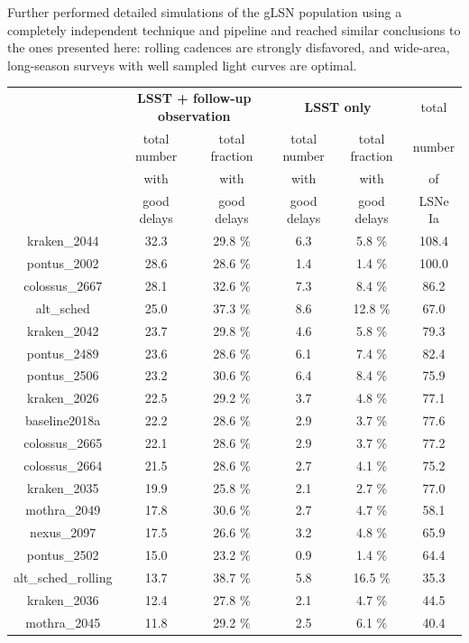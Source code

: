 Further \cite{Goldstein:2018bue} performed detailed simulations of the gLSN population using a completely independent technique and pipeline and reached similar conclusions to the ones presented here: rolling cadences are strongly disfavored, and wide-area, long-season surveys with well sampled light curves are optimal.


\begin{table}
\centering
\begin{tabular}{c|c|c|c|c|c}
\multicolumn{1}{c}{}& \multicolumn{2}{c}{\textbf{LSST + follow-up observation}}  & \multicolumn{2}{c}{\textbf{LSST only}} & \multicolumn{1}{c}{total } \\

& total number  & total fraction  & total number  & total fraction  & number \\
&  with & with & with& with & of\\
& good delays & good delays& good delays& good delays&LSNe Ia\\
\hline
kraken\_2044 & 32.3 & 29.8 \% & 6.3 & 5.8 \% & 108.4 \\
\hline
pontus\_2002 & 28.6 & 28.6 \% & 1.4 & 1.4 \% & 100.0\\
\hline
colossus\_2667 & 28.1 & 32.6 \% & 7.3 & 8.4 \% & 86.2 \\
\hline
alt\_sched & 25.0 & 37.3 \% & 8.6 & 12.8 \% & 67.0 \\
\hline
kraken\_2042 & 23.7 &  29.8 \% & 4.6 & 5.8 \% & 79.3 \\
\hline
pontus\_2489 & 23.6 &  28.6 \% & 6.1 & 7.4 \% & 82.4 \\
\hline
pontus\_2506 & 23.2 & 30.6 \% & 6.4 & 8.4 \% & 75.9 \\
\hline
kraken\_2026 & 22.5 &  29.2 \% & 3.7 & 4.8 \% & 77.1 \\
\hline
baseline2018a & 22.2 &  28.6 \% & 2.9 & 3.7 \% & 77.6  \\
\hline
colossus\_2665 & 22.1 & 28.6 \% & 2.9 & 3.7 \% & 77.2  \\
\hline
colossus\_2664 & 21.5 & 28.6 \% & 2.7 & 4.1 \% & 75.2  \\
\hline
kraken\_2035 & 19.9 &  25.8 \% & 2.1 & 2.7 \% & 77.0 \\
\hline
mothra\_2049 & 17.8&  30.6 \% & 2.7 & 4.7 \% & 58.1\\
\hline
nexus\_2097 & 17.5&  26.6 \% & 3.2 & 4.8 \% & 65.9 \\
\hline
pontus\_2502 & 15.0 &  23.2 \% & 0.9 & 1.4 \% & 64.4 \\
\hline
alt\_sched\_rolling & 13.7 &  38.7 \% & 5.8 & 16.5 \% & 35.3 \\
\hline
kraken\_2036 & 12.4 &  27.8 \% & 2.1 & 4.7 \% & 44.5 \\
\hline
mothra\_2045 & 11.8& 29.2 \% & 2.5 & 6.1 \% & 40.4\\


\end{tabular}
\end{table}
